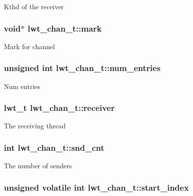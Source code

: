 Kthd of the receiver \hypertarget{structlwt__channel_a83384d85ee5b6089fdec51fd65bf33d0}{
\subsubsection[{mark}]{\setlength{\rightskip}{0pt plus 5cm}void$\ast$ lwt\+\_\+chan\+\_\+t\+::mark}}\label{structlwt__channel_a83384d85ee5b6089fdec51fd65bf33d0}
Mark for channel \hypertarget{structlwt__channel_ad937a8d4e82d1f7a66b36b4cbe66dd86}{
\subsubsection[{num\+\_\+entries}]{\setlength{\rightskip}{0pt plus 5cm}unsigned int lwt\+\_\+chan\+\_\+t\+::num\+\_\+entries}}\label{structlwt__channel_ad937a8d4e82d1f7a66b36b4cbe66dd86}
Num entries \hypertarget{structlwt__channel_a740680d836200bfc87150333e4d62785}{
\subsubsection[{receiver}]{\setlength{\rightskip}{0pt plus 5cm}lwt\+\_\+t lwt\+\_\+chan\+\_\+t\+::receiver}}\label{structlwt__channel_a740680d836200bfc87150333e4d62785}
The receiving thread \hypertarget{structlwt__channel_ab7687f6e58c0d4cb4c2de7db501fb046}{
\subsubsection[{snd\+\_\+cnt}]{\setlength{\rightskip}{0pt plus 5cm}int lwt\+\_\+chan\+\_\+t\+::snd\+\_\+cnt}}\label{structlwt__channel_ab7687f6e58c0d4cb4c2de7db501fb046}
The number of senders \hypertarget{structlwt__channel_aa4256bc415edf531c5abf77d0103e0d4}{
\subsubsection[{start\+\_\+index}]{\setlength{\rightskip}{0pt plus 5cm}unsigned volatile int lwt\+\_\+chan\+\_\+t\+::start\+\_\+index}}\label{structlwt__channel_aa4256bc415edf531c5abf77d0103e0d4}
